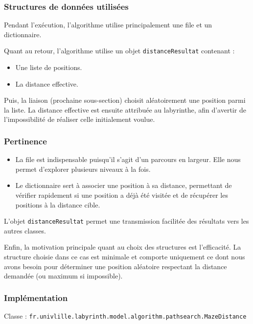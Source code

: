 \documentclass{butexFR}
\begin{document}
\subsubsection{Structures de données utilisées}

Pendant l'exécution, l'algorithme utilise principalement une file et un dictionnaire.

Quant au retour, l'algorithme utilise un objet \texttt{distanceResultat} contenant :
  
\begin{itemize}
\item Une liste de positions.
\item La distance effective.
\end{itemize}

Puis, la liaison (prochaine sous-section) choisit aléatoirement une position parmi la liste.
La distance effective est ensuite attribuée au labyrinthe, afin d'avertir de l'impossibilité de réaliser celle initialement voulue.

\subsubsection{Pertinence}

\begin{itemize}
\item La file est indispensable puisqu'il s'agit d'un parcours en largeur. Elle nous permet d'explorer plusieurs niveaux à la fois.
\item Le dictionnaire sert à associer une position à sa distance, permettant de vérifier rapidement si une position a déjà été visitée et de récupérer les positions à la distance cible.
\end{itemize}

L'objet \texttt{distanceResultat} permet une transmission facilitée des résultats vers les autres classes.

Enfin, la motivation principale quant au choix des structures est l'efficacité. La structure choisie dans ce cas est minimale et comporte uniquement ce dont nous avons besoin pour déterminer une position aléatoire respectant la distance demandée (ou maximum si impossible).

\subsubsection{Implémentation}

Classe : \texttt{fr.univlille.labyrinth.model.algorithm.pathsearch.MazeDistance}
\end{document}
